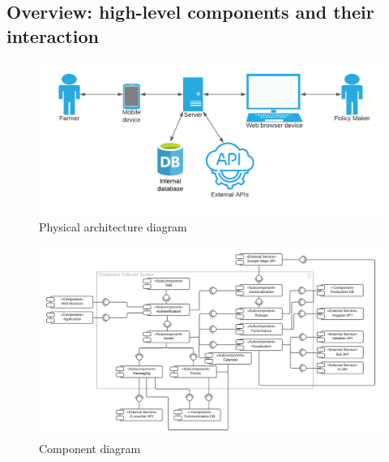 \subsection{Overview: high-level components and their interaction}


\begin{figure} [!h]
	\centering
	\includegraphics[width=\textwidth]{Images/architecture-diagram.png}
	\caption{\label{fig:seq} Physical architecture diagram}
\end{figure}

\begin{figure} [!h]
	\centering
	\includegraphics[width=\textwidth]{Images/component-diagram.png}
	\caption{\label{fig:seq} Component diagram}
\end{figure}